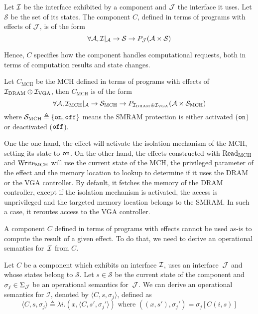 \begin{definition}[Component] \label{def:freespec:component-model} Let $\mathcal{I}$ be
  the interface exhibited by a component and $\mathcal{J}$ the interface it uses.
  Let $\mathcal{S}$ be the set of its states.
  The component $C$, defined in terms of programs with effects of $\mathcal{J}$, is of
  the form
  \[ \forall \mathcal{A}, \mathcal{I}|_{\mathcal{A}} \rightarrow \mathcal{S}
    \rightarrow P_{\mathcal{J}}(\mathcal{A} \times \mathcal{S}) \]
\end{definition}

Hence, $C$ specifies how the component handles computational requests, both in
terms of computation results and state changes.

\begin{example} \label{ex:mch-specs} Let $C_{\mathrm{MCH}}$
  be the MCH defined in terms of programs with effects of
  $\mathcal{I}_{\mathrm{DRAM}} \oplus \mathcal{I}_{\mathrm{VGA}}$, then $C_{\mathrm{MCH}}$ is of
  the form
  \[
    \forall \mathcal{A}, \mathcal{I}_{\mathrm{MCH}}|_{\mathcal{A}} \rightarrow
    \mathcal{S}_{\mathrm{MCH}} \rightarrow P_{\mathcal{I}_{\mathrm{DRAM}} \oplus
      \mathcal{I}_{\mathrm{VGA}}}(\mathcal{A} \times \mathcal{S}_{\mathrm{MCH}})
  \] where $\mathcal{S}_{\mathrm{MCH}} \triangleq \{ \mathtt{on}, \mathtt{off} \}$
  means the SMRAM protection is either activated ($\mathtt{on}$) or deactivated
  ($\mathtt{off}$).

  One the one hand, the  effect will activate the isolation mechanism
  of the MCH, setting its state to $\mathtt{on}$.
  On the other hand, the effects constructed with $\mathrm{Read}_{\mathrm{MCH}}$
  and $\mathrm{Write}_{\mathrm{MCH}}$ will use the current state of the MCH, the
  privileged parameter of the effect and the memory location to lookup to
  determine if it uses the DRAM or the VGA controller.
  By default, it fetches the memory of the DRAM controller, except if the
  isolation mechanism is activated, the access is unprivileged and the targeted
  memory location belongs to the SMRAM.
  In such a case, it reroutes access to the VGA controller.
\end{example}

A component $C$ defined in terms of programs with effects cannot be used as-is
to compute the result of a given effect.
%
To do that, we need to derive an operational semantics for~$\mathcal{I}$ from $C$.

\begin{definition} \label{def:freespec:derivation} Let $C$ be a component which
  exhibits an interface $\mathcal{I}$, uses an interface~$\mathcal{J}$ and whose states belong to
  $\mathcal{S}$.
  Let $s \in \mathcal{S}$ be the current state of the component and
  $\sigma_j \in \Sigma_{\mathcal{J}}$ be an operational semantics for~$\mathcal{J}$.
  We can derive an operational semantics for $\mathcal{I}$, denoted by
  $\langle C, s, \sigma_j \rangle$, defined as
  \[ \langle C, s, \sigma_j \rangle \triangleq \lambda i. (x, \langle C, s',
    \sigma_j' \rangle) \text{ where } ((x, s'), \sigma_j') = \sigma_j[C (i, s)]
  \]
\end{definition}

